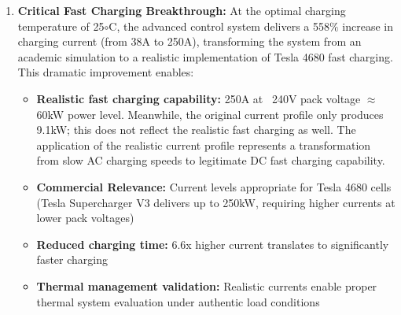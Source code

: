 \documentclass[conference]{IEEEtran}
\begin{document}
\begin{enumerate}
    \item \textbf{Critical Fast Charging Breakthrough:} At the optimal charging temperature of 25$\circ$C, the advanced control system delivers a 558$\%$ increase in charging current (from 38A to 250A), transforming the system from an academic simulation to a realistic implementation of Tesla 4680 fast charging. This dramatic improvement enables:
    
    \begin{itemize}
        \item \textbf{Realistic fast charging capability:} 250A at ~240V pack voltage $\approx$ 60kW power level. Meanwhile, the original current profile only produces 9.1kW; this does not reflect the realistic fast charging as well. The application of the realistic current profile represents a transformation from slow AC charging speeds to legitimate DC fast charging capability.
        \item \textbf{Commercial Relevance:}  Current levels appropriate for Tesla 4680 cells (Tesla Supercharger V3 delivers up to 250kW, requiring higher currents at lower pack voltages) \cite{tesla2025charging}
        \item \textbf{Reduced charging time:} 6.6x higher current translates to significantly faster charging
        \item \textbf{Thermal management validation:} Realistic currents enable proper thermal system evaluation under authentic load conditions
    \end{itemize}
    


\end{enumerate}
\end{document}
